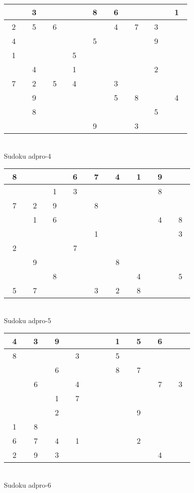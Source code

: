 \documentclass[12pt,a4paper]{article}
\begin{document}
\vfill
\begin{center}
\begin{tabular}{||c|c|c||c|c|c||c|c|c||}\hline\hline
~ ~&~3~&~ ~&~ ~&~8~&~6~&~ ~&~ ~&~1~\\\hline
~2~&~5~&~6~&~ ~&~ ~&~4~&~7~&~3~&~ ~\\\hline
~4~&~ ~&~ ~&~ ~&~5~&~ ~&~ ~&~9~&~ ~\\\hline
\hline
~1~&~ ~&~ ~&~5~&~ ~&~ ~&~ ~&~ ~&~ ~\\\hline
~ ~&~4~&~ ~&~1~&~ ~&~ ~&~ ~&~2~&~ ~\\\hline
~7~&~2~&~5~&~4~&~ ~&~3~&~ ~&~ ~&~ ~\\\hline
\hline
~ ~&~9~&~ ~&~ ~&~ ~&~5~&~8~&~ ~&~4~\\\hline
~ ~&~8~&~ ~&~ ~&~ ~&~ ~&~ ~&~5~&~ ~\\\hline
~ ~&~ ~&~ ~&~ ~&~9~&~ ~&~3~&~ ~&~ ~\\\hline
\hline\end{tabular}\\[1.5ex]
Sudoku adpro-4
\end{center}
\vfill
\begin{center}
\begin{tabular}{||c|c|c||c|c|c||c|c|c||}\hline\hline
~8~&~ ~&~ ~&~6~&~7~&~4~&~1~&~9~&~ ~\\\hline
~ ~&~ ~&~1~&~3~&~ ~&~ ~&~ ~&~8~&~ ~\\\hline
~7~&~2~&~9~&~ ~&~8~&~ ~&~ ~&~ ~&~ ~\\\hline
\hline
~ ~&~1~&~6~&~ ~&~ ~&~ ~&~ ~&~4~&~8~\\\hline
~ ~&~ ~&~ ~&~ ~&~1~&~ ~&~ ~&~ ~&~3~\\\hline
~2~&~ ~&~ ~&~7~&~ ~&~ ~&~ ~&~ ~&~ ~\\\hline
\hline
~ ~&~9~&~ ~&~ ~&~ ~&~8~&~ ~&~ ~&~ ~\\\hline
~ ~&~ ~&~8~&~ ~&~ ~&~ ~&~4~&~ ~&~5~\\\hline
~5~&~7~&~ ~&~ ~&~3~&~2~&~8~&~ ~&~ ~\\\hline
\hline\end{tabular}\\[1.5ex]
Sudoku adpro-5
\end{center}
\vfill
\begin{center}
\begin{tabular}{||c|c|c||c|c|c||c|c|c||}\hline\hline
~4~&~3~&~9~&~ ~&~ ~&~1~&~5~&~6~&~ ~\\\hline
~8~&~ ~&~ ~&~3~&~ ~&~5~&~ ~&~ ~&~ ~\\\hline
~ ~&~ ~&~6~&~ ~&~ ~&~8~&~7~&~ ~&~ ~\\\hline
\hline
~ ~&~6~&~ ~&~4~&~ ~&~ ~&~ ~&~7~&~3~\\\hline
~ ~&~ ~&~1~&~7~&~ ~&~ ~&~ ~&~ ~&~ ~\\\hline
~ ~&~ ~&~2~&~ ~&~ ~&~ ~&~9~&~ ~&~ ~\\\hline
\hline
~1~&~8~&~ ~&~ ~&~ ~&~ ~&~ ~&~ ~&~ ~\\\hline
~6~&~7~&~4~&~1~&~ ~&~ ~&~2~&~ ~&~ ~\\\hline
~2~&~9~&~3~&~ ~&~ ~&~ ~&~ ~&~4~&~ ~\\\hline
\hline\end{tabular}\\[1.5ex]
Sudoku adpro-6
\end{center}
\end{document}
